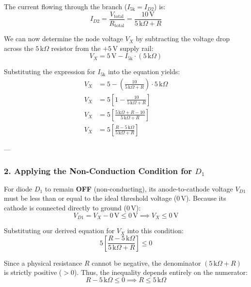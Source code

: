 \documentclass[12pt,a3paper]{article}
\begin{document}
\begin{enumerate}
\begin{tcolorbox}[enhanced,breakable,ansbox,colback=cA!4,colframe=cA,boxrule=0.8pt,arc=5pt,title={\textbf{Answer}},fonttitle=\bfseries\color{white},colbacktitle=cA]
The current flowing through the branch ($I_{5\text{k}} = I_{D2}$) is:
\begin{equation}
I_{D2} = \frac{V_{\text{total}}}{R_{\text{total}}} = \frac{10\,\text{V}}{5\,\text{k}\Omega + R}
\end{equation}

We can now determine the node voltage $V_X$ by subtracting the voltage drop across the $5\,\text{k}\Omega$ resistor from the $+5\,\text{V}$ supply rail:
\begin{equation}
V_X = 5\,\text{V} - I_{5\text{k}} \cdot (5\,\text{k}\Omega)
\end{equation}

Substituting the expression for $I_{5\text{k}}$ into the equation yields:
\begin{align}
V_X &= 5 - \left( \frac{10}{5\,\text{k}\Omega + R} \right) \cdot 5\,\text{k}\Omega \nonumber \\
V_X &= 5 \left[ 1 - \frac{10}{5\,\text{k}\Omega + R} \right] \nonumber \\
V_X &= 5 \left[ \frac{5\,\text{k}\Omega + R - 10}{5\,\text{k}\Omega + R} \right] \nonumber \\
V_X &= 5 \left[ \frac{R - 5\,\text{k}\Omega}{5\,\text{k}\Omega + R} \right]
\end{align}

---

\subsubsection*{2. Applying the Non-Conduction Condition for $D_1$}
For diode $D_1$ to remain \textbf{OFF} (non-conducting), its anode-to-cathode voltage $V_{D1}$ must be less than or equal to the ideal threshold voltage ($0\,\text{V}$). Because its cathode is connected directly to ground ($0\,\text{V}$):
\begin{equation}
V_{D1} = V_X - 0\,\text{V} \le 0\,\text{V} \implies V_X \le 0\,\text{V}
\end{equation}

Substituting our derived equation for $V_X$ into this condition:
\begin{equation}
5 \left[ \frac{R - 5\,\text{k}\Omega}{5\,\text{k}\Omega + R} \right] \le 0
\end{equation}

Since a physical resistance $R$ cannot be negative, the denominator $(5\,\text{k}\Omega + R)$ is strictly positive ($>0$). Thus, the inequality depends entirely on the numerator:
\begin{equation}
R - 5\,\text{k}\Omega \le 0 \implies R \le 5\,\text{k}\Omega
\end{equation}


\end{tcolorbox}
\end{enumerate}
\end{document}
